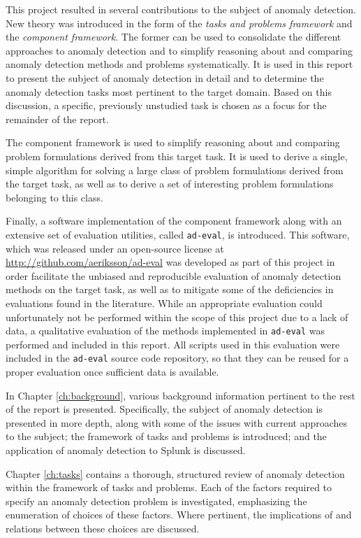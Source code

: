 This project resulted in several contributions to the subject of anomaly detection. New theory was introduced in the form of the \emph{tasks and problems framework} and the \emph{component framework}. The former can be used to consolidate the different approaches to anomaly detection and to simplify reasoning about and comparing anomaly detection methods and problems systematically. It is used in this report to present the subject of anomaly detection in detail and to determine the anomaly detection tasks most pertinent to the target domain. Based on this discussion, a specific, previously unstudied task is chosen as a focus for the remainder of the report.

The component framework is used to simplify reasoning about and comparing problem formulations derived from this target task. It is used to derive a single, simple algorithm for solving a large class of problem formulations derived from the target task, as well as to derive a set of interesting problem formulations belonging to this class.

Finally, a software implementation of the component framework along with an extensive set of evaluation utilities, called \texttt{ad-eval}, is introduced. This software, which was released under an open-source license at \url{http://github.com/aeriksson/ad-eval} was developed as part of this project in order facilitate the unbiased and reproducible evaluation of anomaly detection methods on the target task, as well as to mitigate some of the deficiencies in evaluations found in the literature. While an appropriate evaluation could unfortunately not be performed within the scope of this project due to a lack of data, a qualitative evaluation of the methods implemented in \texttt{ad-eval} was performed and included in this report. All scripts used in this evaluation were included in the \texttt{ad-eval} source code repository, so that they can be reused for a proper evaluation once sufficient data is available.

In Chapter \ref{ch:background}, various background information pertinent to the rest of the report is presented. Specifically, the subject of anomaly detection is presented in more depth, along with some of the issues with current approaches to the subject; the framework of tasks and problems is introduced; and the application of anomaly detection to Splunk is discussed. 

Chapter \ref{ch:tasks} contains a thorough, structured review of anomaly detection within the framework of tasks and problems. Each of the factors required to specify an anomaly detection problem is investigated, emphasizing the enumeration of choices of these factors. Where pertinent, the implications of and relations between these choices are discussed.

